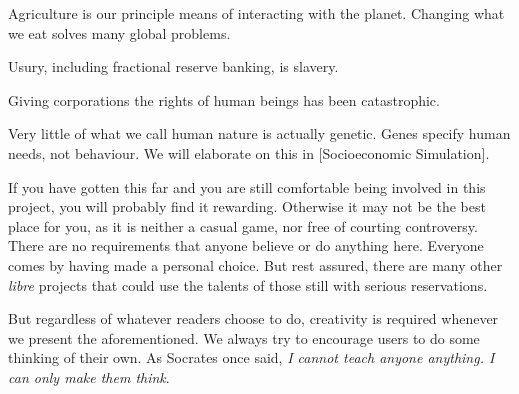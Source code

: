 
Agriculture is our principle means of interacting with the planet. Changing what we eat solves many global problems.


Usury, including fractional reserve banking, is slavery.


Giving corporations the rights of human beings has been catastrophic.


Very little of what we call human nature is actually genetic. Genes specify human needs, not behaviour. We will elaborate on this in [Socioeconomic Simulation].
\stopitemize

If you have gotten this far and you are still comfortable being involved in this project, you will probably find it rewarding. Otherwise it may not be the best place for you, as it is neither a casual game, nor free of courting controversy. There are no requirements that anyone believe or do anything here. Everyone comes by having made a personal choice. But rest assured, there are many other {\it libre} projects that could use the talents of those still with serious reservations.

But regardless of whatever readers choose to do, creativity is required whenever we present the aforementioned. We always try to encourage users to do some thinking of their own. As Socrates once said, {\it I cannot teach anyone anything. I can only make them think}.

\StopChapter

